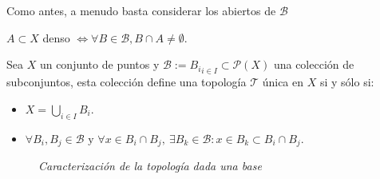\begin{pg}
    Como antes, a menudo basta considerar los abiertos de $\mathcal{B}$ 
\end{pg}

\begin{il}
$A \subset X$ denso $\Leftrightarrow \forall B \in \mathcal{B}, B \cap A \neq \emptyset$.
\end{il}

\begin{prop}
Sea $X$ un conjunto de puntos y $\mathcal{B} := {B_i}_{i\in I} \subset \mathcal{P}\left( X \right)$ una colección de subconjuntos, esta colección define una topología $\mathcal{T}$ única en $X$ si y sólo si: 
\begin{itemize}
    \item $X = \bigcup_{i\in I} B_i$.
    \item $\forall B_i,B_j\in \mathcal{B} \mbox{ y } \forall x \in B_i \cap B_j, \ \exists B_k \in \mathcal{B} : x\in B_k\subset B_i \cap B_j$.
\end{itemize}
\begin{figure}[H]
    \centering
    \caption{\textit{Caracterización de la topología dada una base}}
    \label{fig:caracterización-de-la-topología-dada-una-base}
\end{figure}

\end{prop}
